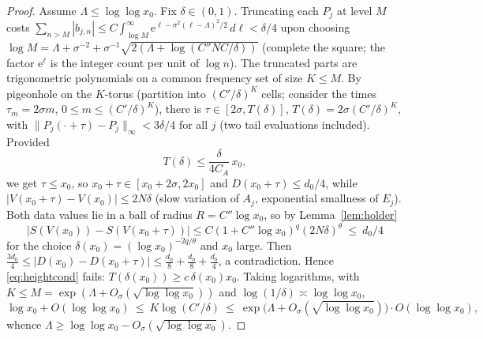 \documentclass[11pt]{amsart}
\theoremstyle{plain}
\theoremstyle{definition}
\theoremstyle{remark}
\newcommand{\eE}{\mathrm{e}}
\newcommand{\dd}{\,d}
\begin{document}
\begin{proof}
Assume $\Lambda\le\log\log x_0$. Fix $\delta\in(0,1)$. Truncating each $P_j$ at level $M$ costs
$\sum_{n>M}|b_{j,n}|\le C\int_{\log M}^\infty\eE^{\ell-\sigma^2(\ell-\Lambda)^2/2}\dd\ell
<\delta/4$ upon choosing
$\log M=\Lambda+\sigma^{-2}+\sigma^{-1}\sqrt{2(\Lambda+\log(C''NC/\delta))}$ (complete the square;
the factor $\eE^\ell$ is the integer count per unit of $\log n$). The truncated parts are
trigonometric polynomials on a common frequency set of size $K\le M$. By pigeonhole on the
$K$-torus (partition into $(C'/\delta)^K$ cells; consider the times $\tau_m=2\sigma m$,
$0\le m\le(C'/\delta)^K$), there is $\tau\in[2\sigma,T(\delta)]$, $T(\delta)=2\sigma(C'/\delta)^K$,
with $\|P_j(\cdot+\tau)-P_j\|_\infty<3\delta/4$ for all $j$ (two tail evaluations included).
Provided
\begin{equation}\label{eq:heightcond}
T(\delta)\le\frac{\delta}{4C_A}\,x_0 ,
\end{equation}
we get $\tau\le x_0$, so $x_0+\tau\in[x_0+2\sigma,2x_0]$ and $D(x_0+\tau)\le d_0/4$, while
$|V(x_0+\tau)-V(x_0)|\le2N\delta$ (slow variation of $A_j$, exponential smallness of $E_j$). Both
data values lie in a ball of radius $R=C''\log x_0$, so by Lemma~\ref{lem:holder}
\[
|S(V(x_0))-S(V(x_0+\tau))|\le C(1+C''\log x_0)^q(2N\delta)^\theta\ \le\ d_0/4
\]
for the choice $\delta(x_0)=(\log x_0)^{-2q/\theta}$ and $x_0$ large. Then
$\tfrac{3d_0}4\le|D(x_0)-D(x_0+\tau)|\le\tfrac{d_0}8+\tfrac{d_0}8+\tfrac{d_0}4$, a contradiction.
Hence \eqref{eq:heightcond} fails: $T(\delta(x_0))\ge c\,\delta(x_0)x_0$. Taking logarithms, with
$K\le M=\exp(\Lambda+O_\sigma(\sqrt{\log\log x_0}))$ and $\log(1/\delta)\asymp\log\log x_0$,
\[
\log x_0+O(\log\log x_0)\ \le\ K\log(C'/\delta)\ \le\
\exp\bigl(\Lambda+O_\sigma(\sqrt{\log\log x_0})\bigr)\cdot O(\log\log x_0),
\]
whence $\Lambda\ge\log\log x_0-O_\sigma(\sqrt{\log\log x_0})$.
\end{proof}
\end{document}
